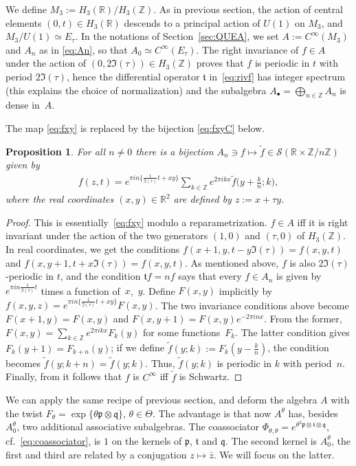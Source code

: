 \documentclass[10pt,a4paper]{amsart}
\numberwithin{equation}{section}
\newtheorem{prop}[thm]{Proposition}
\theoremstyle{definition}
\newcommand{\R}{\mathbb{R}}
\newcommand{\Z}{\mathbb{Z}}
\newcommand{\mc}{\mathcal}
\newcommand{\mf}{\mathfrak}
\newcommand{\ga}{\mf{p}}
\newcommand{\gb}{\mf{q}}
\newcommand{\gc}{\mf{t}}
\begin{document}
We def\/ine $M_3:=H_3(\R)/H_3(\Z)$.
As in previous section,
the action of central elements $(0,t)\in H_3(\R)$ descends to a principal action of $U(1)$ on $M_3$, and $M_3/U(1)\simeq E_\tau$.
In the notations of Section~\ref{sec:QUEA}, we set
$A:=C^\infty(M_3)$ and $A_n$ as in \eqref{eq:An}, so that
$A_0\simeq C^\infty(E_\tau)$.
The right invariance of $f\in A$ under the action of $(0,2\Im(\tau))\in H_3(\Z)$ proves that $f$ is periodic in $t$ with period $2\Im(\tau)$, hence
the dif\/ferential operator $\gc$ in~\eqref{eq:rivf} has integer spectrum (this explains the choice of normalization) and the subalgebra $A_\bullet=\bigoplus_{n\in\Z}A_n$
is dense in~$A$.

The map \eqref{eq:fxy} is replaced by the bijection \eqref{eq:fxyC} below.

\begin{prop}
For all $n\neq 0$ there is a bijection $A_n\ni f\mapsto\widetilde{f}\in\mc{S}(\R\times\Z/n\Z)$ given by
\begin{gather}\label{eq:fxyC}
f(z,t)=e^{\pi in\{\frac{1}{\Im(\tau)}t+xy\}}
\sum_{k\in\Z}e^{2\pi ikx}\widetilde{f}\big(y+\tfrac{k}{n};k\big),
\end{gather}
where the real coordinates $(x,y)\in\R^2$ are defined by $z:=x+\tau y$.
\end{prop}
\begin{proof}
This is essentially~\eqref{eq:fxy} modulo a reparametrization.
$f\in A$ if\/f it is right invariant under the action of the two
generators $(1,0)$ and $(\tau,0)$ of $H_3(\Z)$. In real coordinates,
we get the conditions
$f(x+1,y,t-y\Im(\tau))=f(x,y,t)$
and
$f(x,y+1,t+x\Im(\tau))=f(x,y,t)$.
As mentioned above, $f$ is also $2\Im(\tau)$-periodic in $t$, and
the condition $\gc f=nf$ says that every $f\in A_n$ is given by
$e^{\pi in\frac{1}{\Im(\tau)}t}$ times a function of~$x$,~$y$.
Def\/ine $F(x,y)$ implicitly by $f(x,y,z)=e^{\pi in\{\frac{1}{\Im(\tau)}t+xy\}}F(x,y)$.
The two invariance conditions above become $F(x+1,y)=F(x,y)$ and
$F(x,y+1)=F(x,y)e^{-2\pi inx}$. From the former, $F(x,y)=\sum\limits_{k\in\Z}e^{2\pi ikx}F_k(y)$ for some functions~$F_k$. The latter condition gives
$F_k(y+1)=F_{k+n}(y)$; if we def\/ine $\widetilde{f}(y;k):=F_k(y-\frac{k}{n})$,
the condition becomes $\widetilde{f}(y;k+n)=\widetilde{f}(y;k)$. Thus,
$\widetilde{f}(y;k)$ is periodic in $k$ with period~$n$.
Finally, from \cite[Lemma~3.2]{DFF13} it follows that $f$ is $C^\infty$
if\/f $\widetilde{f}$ is Schwartz.
\end{proof}

We can apply the same recipe of previous section, and deform the algebra $A$ with the twist $F_\theta=\exp\big\{\theta \ga \otimes\gb\big\}$, $\theta\in\Theta$.
The advantage is that now $A^\theta$ has, besides $A^\theta_0$, two additional associative subalgebras.
The coassociator
$\Phi_{\theta,\theta}=e^{\theta^2\ga \otimes \gc \otimes \gb}$, cf.~\eqref{eq:coassociator},
is $1$ on the kernels of $\ga$, $\gc$ and $\gb$. The second kernel is $A_0^\theta$, the f\/irst and third are related by a conjugation $z\mapsto\bar z$. We will focus on the latter.
\end{document}

